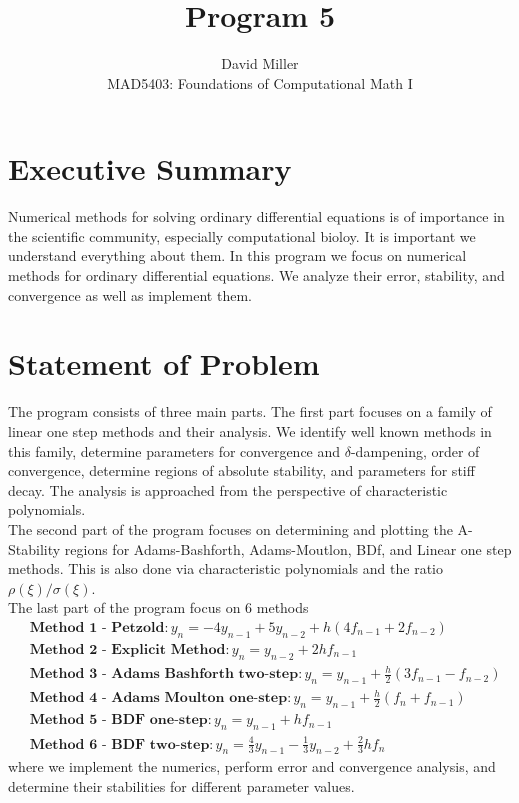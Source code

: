 \documentclass[12pt]{article}
\theoremstyle{remark}
\begin{document}
 
\title{Program 5}
\author{David Miller \\ 
MAD5403: Foundations of Computational Math I} 
 
\maketitle

\section{Executive Summary}

Numerical methods for solving ordinary differential equations is of importance in the scientific community, especially computational bioloy. It is important we understand everything about them. In this program we focus on numerical methods for ordinary differential equations. We analyze their error, stability, and convergence as well as implement them. 

\section{Statement of Problem} 

The program consists of three main parts. The first part focuses on a family of linear one step methods and their analysis. We identify well known methods in this family, determine parameters for convergence and $\delta$-dampening, order of convergence, determine regions of absolute stability, and parameters for stiff decay. The analysis is approached from the perspective of characteristic polynomials. \\

The second part of the program focuses on determining and plotting the A-Stability regions for Adams-Bashforth, Adams-Moutlon, BDf, and Linear one step methods. This is also done via characteristic polynomials and the ratio $\rho(\xi)/\sigma(\xi)$. \\

The last part of the program focus on 6 methods
\begin{align*}
	& \textbf{Method 1 - Petzold} : y_n = -4y_{n-1} + 5y_{n-2} + h(4f_{n-1} + 2f_{n-2}) \\
	& \textbf{Method 2 - Explicit Method} : y_n = y_{n-2} + 2hf_{n-1} \\
	& \textbf{Method 3 - Adams Bashforth two-step} : y_n = y_{n-1} + \frac{h}{2}(3f_{n-1} - f_{n-2}) \\
	& \textbf{Method 4 - Adams Moulton one-step} : y_n = y_{n-1} + \frac{h}{2}(f_n + f_{n-1}) \\ 
	& \textbf{Method 5 - BDF one-step} : y_n = y_{n-1} + hf_{n-1} \\
	& \textbf{Method 6 - BDF two-step} : y_n = \frac{4}{3}y_{n-1} - \frac{1}{3}y_{n-2} + \frac{2}{3}hf_n
\end{align*}
where we implement the numerics, perform error and convergence analysis, and determine their stabilities for different parameter values. 
\end{document}
